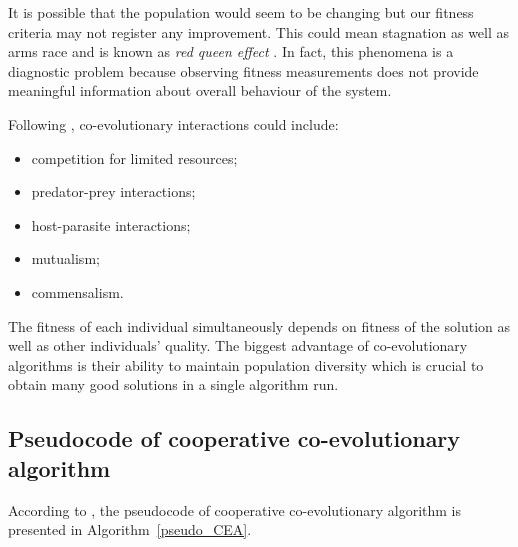 It is possible that the population would seem to be changing but our fitness criteria may not register any improvement.
This could mean stagnation as well as arms race and is known as \emph{red queen effect} \cite{co-evol}.
In fact, this phenomena is a diagnostic problem because observing fitness measurements does not provide meaningful information about overall behaviour of the system.
 


Following \cite{Dre}, co-evolutionary interactions could include:

\begin{itemize}
  \item competition for limited resources;
  \item predator-prey interactions;
  \item host-parasite interactions;
  \item mutualism;
  \item commensalism.
\end{itemize}

The fitness of each individual simultaneously depends on fitness of the solution as well as other individuals' quality.
The biggest advantage of co-evolutionary algorithms is their ability to maintain population diversity which is crucial to obtain many good solutions in a single algorithm run.    

  
\subsection{Pseudocode of cooperative co-evolutionary algorithm}

According to \cite{co-evol}, the pseudocode of cooperative co-evolutionary algorithm is presented in Algorithm~\ref{pseudo_CEA}.

% 
% 
% 
% 
% 

